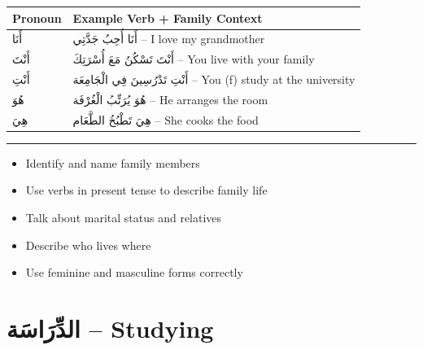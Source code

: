 \documentclass[
  a4paper,
  DIV=11,
  numbers=noendperiod]{scrartcl}
\providecommand{\tightlist}{%
  \setlength{\itemsep}{0pt}\setlength{\parskip}{0pt}}
\begin{document}
\begin{longtable}[]{@{}ll@{}}
\toprule\noalign{}
Pronoun & Example Verb + Family Context \\
\midrule\noalign{}
\endhead
\bottomrule\noalign{}
\endlastfoot
أَنَا & أَنَا أُحِبُ جَدَّتِي -- I love my grandmother \\
أَنْتَ & أَنْتَ تَسْكُنُ مَعَ أُسْرَتِكَ -- You live with your family \\
أَنْتِ & أَنْتِ تَدْرُسِينَ فِي الْجَامِعَة -- You (f) study at the university \\
هُوَ & هُوَ يُرَتِّبُ الْغُرْفَة -- He arranges the room \\
هِيَ & هِيَ تَطْبُخُ الطَّعَام -- She cooks the food \\
\end{longtable}

\begin{center}\rule{0.5\linewidth}{0.5pt}\end{center}

\begin{tcolorbox}[enhanced jigsaw, bottomrule=.15mm, arc=.35mm, colbacktitle=quarto-callout-note-color!10!white, opacityback=0, toptitle=1mm, title=\textcolor{quarto-callout-note-color}{\faInfo}\hspace{0.5em}{Review Checklist}, colframe=quarto-callout-note-color-frame, opacitybacktitle=0.6, colback=white, coltitle=black, titlerule=0mm, left=2mm, toprule=.15mm, bottomtitle=1mm, rightrule=.15mm, leftrule=.75mm, breakable]

\begin{itemize}
\tightlist
\item[$\square$]
  Identify and name family members\\
\item[$\square$]
  Use verbs in present tense to describe family life\\
\item[$\square$]
  Talk about marital status and relatives\\
\item[$\square$]
  Describe who lives where\\
\item[$\square$]
  Use feminine and masculine forms correctly
\end{itemize}

\end{tcolorbox}

\section{الدِّرَاسَة -- Studying}\label{unit3-studying}
\end{document}
